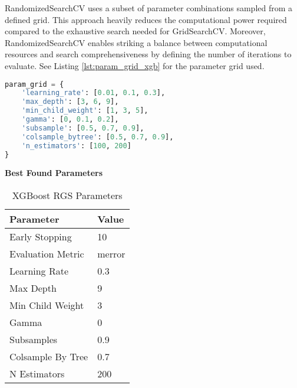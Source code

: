 RandomizedSearchCV uses a subset of parameter combinations sampled from a defined grid. This approach heavily reduces the computational power required compared to the exhaustive search needed for GridSearchCV. Moreover, RandomizedSearchCV enables striking a balance between computational resources and search comprehensiveness by defining the number of iterations to evaluate. See Listing \ref{lst:param_grid_xgb} for the parameter grid used.
\newpage
\begin{lstlisting}[language=Python, caption={Grid Search Parameters For XGBoost}, label= lst:param_grid_xgb]
param_grid = {
    'learning_rate': [0.01, 0.1, 0.3],
    'max_depth': [3, 6, 9],
    'min_child_weight': [1, 3, 5],
    'gamma': [0, 0.1, 0.2],
    'subsample': [0.5, 0.7, 0.9],
    'colsample_bytree': [0.5, 0.7, 0.9],
    'n_estimators': [100, 200]
}
\end{lstlisting}

\textbf{Best Found Parameters}
\medskip

\begin{table}[h]
\captionsetup{justification=centering} 
\centering
\caption{XGBoost RGS Parameters}
\begin{tabular}{ll}
\hline
\textbf{Parameter} & \textbf{Value} \\ \hline
Early Stopping & 10 \\
Evaluation Metric & merror \\
Learning Rate & 0.3 \\
Max Depth & 9 \\
Min Child Weight & 3 \\
Gamma & 0 \\
Subsamples & 0.9 \\
Colsample By Tree & 0.7 \\
N Estimators & 200 \\ \hline
\end{tabular}
\label{tab:xg_rgs_parameters}
\end{table}


